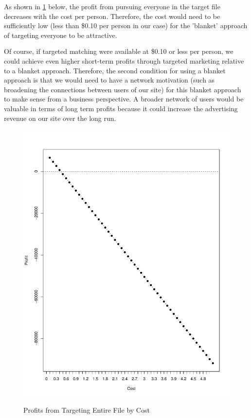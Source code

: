 As shown in \cref{fig:Profit_Grid} below, the profit from pursuing everyone in the target file decreases with the cost per person. Therefore, the cost would need to be sufficiently low (less than \$0.10 per person in our case) for the 'blanket' approach of targeting everyone to be attractive. 

Of course, if targeted matching were available at \$0.10 or less per person, we could achieve even higher short-term profits through targeted marketing relative to a blanket approach. Therefore, the second condition for using a blanket approach is that we would need to have a network motivation (such as broadening the connections between users of our site) for this blanket approach to make sense from a business perspective. A broader network of users would be valuable in terms of long term profits because it could increase the advertising revenue on our site over the long run.

\begin{figure}[!htb]
  \centering
  \caption{Profits from Targeting Entire File by Cost}
  \includegraphics[scale=.5]{Profit_Grid.pdf}
  \label{fig:Profit_Grid}
\end{figure}

